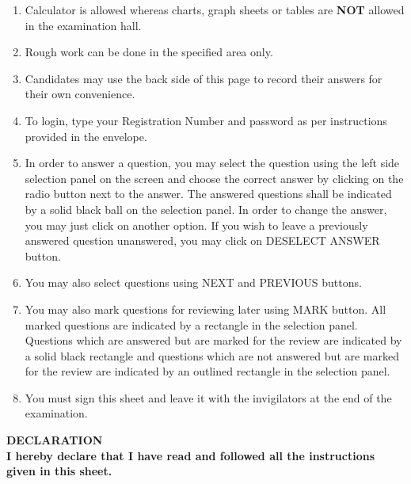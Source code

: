 \documentclass{article}
\begin{document}
\begin{enumerate}
    \item Calculator is allowed whereas charts, graph sheets or tables are \textbf{NOT} allowed in the examination hall.    
    \item Rough work can be done in the specified area only.
    \item Candidates may use the back side of this page to record their answers for their own convenience.    
    \item To login, type your Registration Number and password as per instructions provided in the envelope.   
    \item In order to answer a question, you may select the question using the left side selection panel on the screen and choose the correct answer by clicking on the radio button next to the answer. The answered questions shall be indicated by a solid black ball on the selection panel. In order to change the answer, you may just click on another option. If you wish to leave a previously answered question unanswered, you may click on DESELECT ANSWER button.    
    \item You may also select questions using NEXT and PREVIOUS buttons.    
    \item You may also mark questions for reviewing later using MARK button. All marked questions are indicated by a rectangle in the selection panel. Questions which are answered but are marked for the review are indicated by a solid black rectangle and questions which are not answered but are marked for the review are indicated by an outlined rectangle in the selection panel.    
    \item You must sign this sheet and leave it with the invigilators at the end of the examination.
    
\end{enumerate}
\newpage

\textbf{DECLARATION}\\
\textbf{I hereby declare that I have read and followed all the instructions given in this sheet.}

\begin{center}
\end{center}
\end{document}
